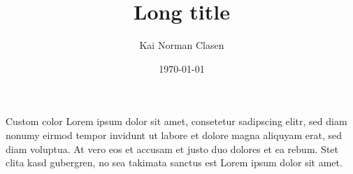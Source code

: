 \documentclass[aspectratio=169]{beamer}
\title[Custom color]{Long title}
\author{Kai Norman Clasen}
\institute{}
\date{\today}
\begin{document}
  \begin{frame}{Custom color}
    Lorem ipsum dolor sit amet, consetetur sadipscing elitr, 
    sed diam nonumy eirmod tempor invidunt ut labore et dolore 
    magna aliquyam erat, sed diam voluptua. 
    At vero eos et accusam et justo duo dolores et ea rebum. 
    Stet clita kasd gubergren, no sea takimata sanctus est 
    Lorem ipsum dolor sit amet. 
  \end{frame}
\end{document}
